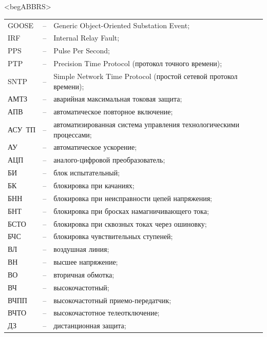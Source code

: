 \color{unidarkgreen}\section*{}
{\color{white}\fontsize{0.1pt}{0.1pt}\selectfont<begABBRS>}
\color{black}
\begin{longtable}{>{\raggedright\arraybackslash}m{2cm}>{\raggedright\arraybackslash}m{0.5cm}>{\raggedright\arraybackslash}m{20cm}}
\endfirsthead\endhead\endfoot\endlastfoot
GOOSE & -- & Generic Object-Oriented Substation Event; \\
IRF & -- & Internal Relay Fault; \\
PPS & -- & Pulse Per Second; \\
PTP & -- & Precision Time Protocol (протокол точного времени); \\
SNTP & -- & Simple Network Time Protocol (простой сетевой протокол времени); \\
АМТЗ & -- & аварийная максимальная токовая защита; \\
АПВ & -- & автоматическое повторное включение; \\
АСУ~ТП & -- & автоматизированная система управления технологическими процессами; \\
АУ & -- & автоматическое ускорение; \\
АЦП & -- & аналого-цифровой преобразователь; \\
БИ & -- & блок испытательный; \\
БК & -- & блокировка при качаниях; \\
БНН & -- & блокировка при неисправности цепей напряжения; \\
БНТ & -- & блокировка при бросках намагничивающего тока; \\
БСТО & -- & блокировка при сквозных токах через ошиновку; \\
БЧС & -- & блокировка чувствительных ступеней; \\
ВЛ & -- & воздушная линия; \\
ВН & -- & высшее напряжение; \\
ВО & -- & вторичная обмотка; \\
ВЧ & -- & высокочастотный; \\
ВЧПП & -- & высокочастотный приемо-передатчик; \\
ВЧТО & -- & высокочастотное телеотключение; \\
ДЗ & -- & дистанционная защита; \\

\end{longtable}
